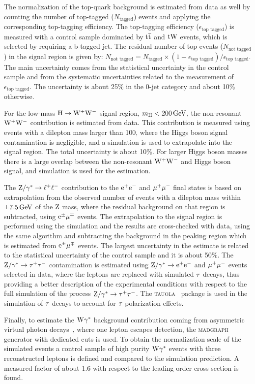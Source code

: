 \documentclass[12pt,twoside,a4paper,cmspaper,final,collab]{cms-tdr}
\begin{document}
The normalization of the top-quark background is estimated from data as well
by counting the number of top-tagged ($N_\text{tagged}$) events and applying the
corresponding top-tagging efficiency. The top-tagging efficiency
($\epsilon_\text{top tagged}$) is measured with a control sample dominated by
$\mathrm{t}\overline{\mathrm{t}}$ and $\mathrm{t}\mathrm{W}$ events, which is selected by requiring a b-tagged jet.
The residual number of top events ($N_\text{not tagged}$) in the signal region is given
by: $N_\text{not tagged} = N_\text{tagged} \times
 (1-\epsilon_\text{top tagged})/\epsilon_\text{top~tagged}$.
The main uncertainty comes from the statistical
uncertainty in the control sample and from the systematic uncertainties related to
the measurement of $\epsilon_\text{top tagged}$. The uncertainty is about
25\% in the 0-jet category and about 10\% otherwise.

For the low-mass $\mathrm{H}\to\mathrm{W^+}{}\mathrm{W^-}$ signal region, $m_{\mathrm{H}} <200\,\text{Ge\hspace{-.08em}V}$,
the non-resonant $\mathrm{W^+}{}\mathrm{W^-}$ contribution is estimated from data. This contribution
is measured using events with a dilepton mass larger than 100\GeV,
where the Higgs boson signal contamination is negligible, and a simulation
is used to extrapolate into the signal region. The total uncertainty is about 10\%.
For larger Higgs boson masses there is a large overlap between the
non-resonant $\mathrm{W^+}{}\mathrm{W^-}$ and Higgs boson signal, and simulation is
used for the estimation.

The $\mathrm{Z}/\gamma^*\to \ell^+\ell^-$ contribution to the $\mathrm{e}^+\mathrm{e}^-$
and ${\mu^+}{\mu^-}$ final states is based on extrapolation from
the observed number of events with a dilepton mass
within $\pm7.5\,\text{Ge\hspace{-.08em}V}$ of the $\mathrm{Z}$ mass, where the residual
background on that region is subtracted, using $\mathrm{e}^{\pm}{\mu}^{\mp}$ events.
The extrapolation to the signal region is performed using the simulation
and the results are cross-checked with data, using the same algorithm and
subtracting the background in the peaking region which is estimated from $\mathrm{e}^{\pm}{\mu}^{\mp}$ events.
The largest uncertainty in the estimate is related to the statistical
uncertainty of the control sample and it is about 50\%.
The $\mathrm{Z}/\gamma^* \to\tau^+\tau^-$ contamination is estimated using $\mathrm{Z}/\gamma^*\to \mathrm{e}^+\mathrm{e}^-$ and ${\mu^+}{\mu^-}$
events selected in data, where the leptons are replaced with simulated
$\tau$ decays, thus providing a better description of the experimental conditions
with respect to the full simulation of the process $\mathrm{Z}/\gamma^* \to\tau^+\tau^-$. The \textsc{tauola}~\cite{tauola} package is used in the
simulation of $\tau$ decays to account for $\tau$ polarization effects.

Finally, to estimate the $\mathrm{W}\gamma^{*}$ background contribution coming
from asymmetric virtual photon decays~\cite{wgammastart}, where one lepton escapes
detection, the \textsc{madgraph} generator with dedicated cuts is
used. To obtain the normalization scale of the
simulated events a control sample of high purity $\mathrm{W}\gamma^{*}$ events with three
reconstructed leptons is defined and compared to the simulation prediction. A
measured factor of about 1.6 with respect to the leading order
cross section is found.
\end{document}

